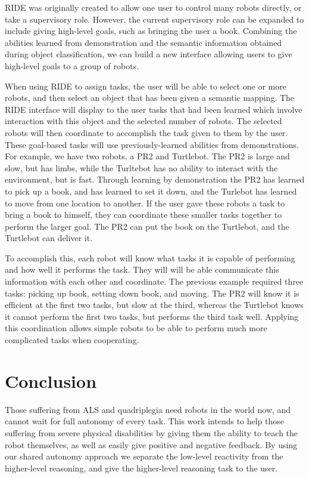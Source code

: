 \documentclass{article}
\begin{document}
RIDE was originally created to allow one user to control many robots directly, or take a supervisory role. However, the current supervisory role can be expanded to include giving high-level goals, such as bringing the user a book. Combining the abilities learned from demonstration and the semantic information obtained during object classification, we can build a new interface allowing users to give high-level goals to a group of robots.

When using RIDE to assign tasks, the user will be able to select one or more robots, and then select an object that has been given a semantic mapping. The RIDE interface will display to the user tasks that had been learned which involve interaction with this object and the selected number of robots. The selected robots will then coordinate to accomplish the task given to them by the user. These goal-based tasks will use previously-learned abilities from demonstrations. For example, we have two robots, a PR2 and Turtlebot. The PR2 is large and slow, but has limbs, while the Turltebot has no ability to interact with the environment, but is fast. Through learning by demonstration the PR2 has learned to pick up a book, and has learned to set it down, and the Turlebot has learned to move from one location to another. If the user gave these robots a task to bring a book to himself, they can coordinate these smaller tasks together to perform the larger goal. The PR2 can put the book on the Turtlebot, and the Turtlebot can deliver it.

To accomplish this, each robot will know what tasks it is capable of performing and how well it performs the task. They will will be able communicate this information with each other and coordinate. The previous example required three tasks: picking up book, setting down book, and moving. The PR2 will know it is efficient at the first two tasks, but slow at the third, whereas the Turtlebot knows it cannot perform the first two tasks, but performs the third task well. Applying this coordination allows simple robots to be able to perform much more complicated tasks when cooperating.

\section{Conclusion}
Those suffering from ALS and quadriplegia need robots in the world now, and cannot wait for full autonomy of every task. This work intends to help those suffering from severe physical disabilities by giving them the ability to teach the robot themselves, as well as easily give positive and negative feedback. By using our shared autonomy approach we separate the low-level reactivity from the higher-level reasoning, and give the higher-level reasoning task to the user. 
\end{document}
